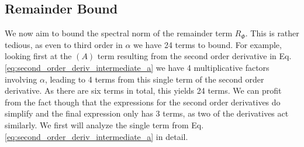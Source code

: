 \documentclass{article}
\begin{document}
\subsection{Remainder Bound}
We now aim to bound the spectral norm of the remainder term $R_{\Phi}$. This is rather tedious, as even to third order in $\alpha$ we have 24 terms to bound. For example, looking first at the $(A)$ term resulting from the second order derivative in Eq. \eqref{eq:second_order_deriv_intermediate_a} we have 4 multiplicative factors involving $\alpha$, leading to 4 terms from this single term of the second order derivative. As there are six terms in total, this yields 24 terms. We can profit from the fact though that the expressions for the second order derivatives do simplify and the final expression only has 3 terms, as two of the derivatives act similarly. We first will analyze the single term from Eq. \eqref{eq:second_order_deriv_intermediate_a} in detail. 
\end{document}
